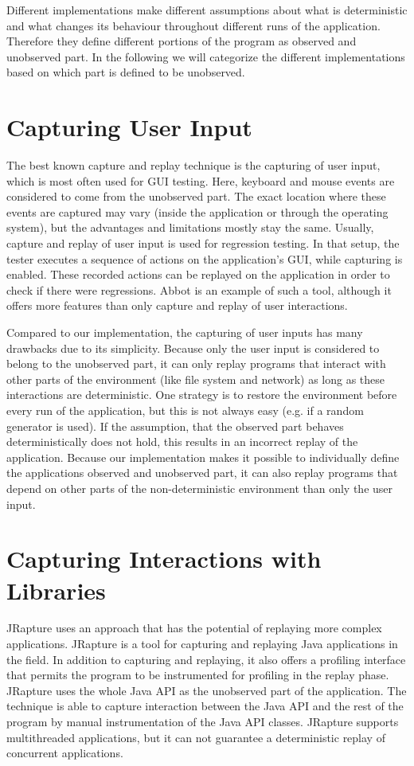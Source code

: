 Different implementations make different assumptions about what is deterministic and what changes its behaviour throughout different runs of the application. Therefore they define different portions of the program as observed and unobserved part. In the following we will categorize the different implementations based on which part is defined to be unobserved.

\section {Capturing User Input}
The best known capture and replay technique is the capturing of user input, which is most often used for GUI testing. Here, keyboard and mouse events are considered to come from the unobserved part. The exact location where these events are captured may vary (inside the application or through the operating system), but the advantages and limitations mostly stay the same. Usually, capture and replay of user input is used for regression testing. In that setup, the tester executes a sequence of actions on the application's GUI, while capturing is enabled. These recorded actions can be replayed on the application in order to check if there were regressions. Abbot \cite{abbot} is an example of such a tool, although it offers more features than only capture and replay of user interactions. %

Compared to our implementation, the capturing of user inputs has many drawbacks due to its simplicity. Because only the user input is considered to belong to the unobserved part, it can only replay programs that interact with other parts of the environment (like file system and network) as long as these interactions are deterministic. One strategy is to restore the environment before every run of the application, but this is not always easy (e.g. if a random generator is used). If the assumption, that the observed part behaves deterministically does not hold, this results in an incorrect replay of the application. Because our implementation makes it possible to individually define the applications observed and unobserved part, it can also replay programs that depend on other parts of the non-deterministic environment than only the user input.

\section {Capturing Interactions with Libraries}
JRapture \cite{jrapture} uses an approach that has the potential of replaying more complex applications. JRapture is a tool for capturing and replaying Java applications in the field. In addition to capturing and replaying, it also offers a profiling interface that permits the program to be instrumented for profiling in the replay phase. JRapture uses the whole Java API as the unobserved part of the application. The technique is able to capture interaction between the Java API and the rest of the program by manual instrumentation of the Java API classes. JRapture supports multithreaded applications, but it can not guarantee a deterministic replay of concurrent applications.


